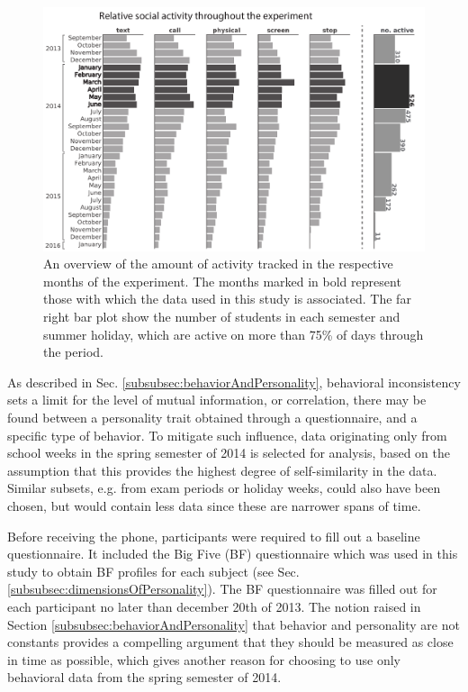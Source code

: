 \begin{figure}[h!]
	\centering
	\includegraphics[width=0.8\linewidth]{figures/data_activity}
	\caption{\label{fig:data_activity}An overview of the amount of activity tracked in the respective months of the experiment. The months marked in bold represent those with which the data used in this study is associated. The far right bar plot show the number of students in each semester and summer holiday, which are active on more than 75\% of days through the period.}
\end{figure}

As described in Sec. \ref{subsubsec:behaviorAndPersonality}, behavioral inconsistency sets a limit for the level of mutual information, or correlation, there may be found between a personality trait obtained through a questionnaire, and a specific type of behavior. To mitigate such influence, data originating only from school weeks in the spring semester of 2014 is selected for analysis, based on the assumption that this provides the highest degree of self-similarity in the data. Similar subsets, e.g. from exam periods or holiday weeks, could also have been chosen, but would contain less data since these are narrower spans of time.

Before receiving the phone, participants were required to fill out a baseline questionnaire. It included the Big Five (BF) questionnaire which was used in this study to obtain BF profiles for each subject (see Sec. \ref{subsubsec:dimensionsOfPersonality}). The BF questionnaire was filled out for each participant no later than december 20th of 2013. The notion raised in Section \ref{subsubsec:behaviorAndPersonality} that behavior and personality are not constants provides a compelling argument that they should be measured as close in time as possible, which gives another reason for choosing to use only behavioral data from the spring semester of 2014.

